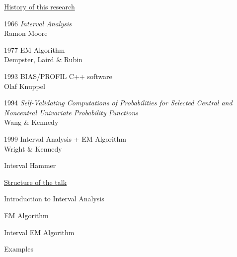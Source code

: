 \documentclass{slides}
\begin{document}
\begin{slide}
\begin{center}
\underline{History of this research}
\end{center}
1966 {\it Interval Analysis} \\
\hspace*{1in} Ramon Moore

1977 EM Algorithm \\
\hspace*{1in} Dempster, Laird \& Rubin

1993 BIAS/PROFIL C++ software \\
\hspace*{1in} Olaf Knuppel

1994 {\it Self-Validating Computations of Probabilities for Selected
        Central and Noncentral Univariate Probability Functions}\\
\hspace*{1in} Wang \& Kennedy

1999 Interval Analysis + EM Algorithm \\
\hspace*{1in} Wright \& Kennedy

\end{slide}
\begin{note}
Interval Hammer
\end{note}
\begin{slide}
\begin{center}
\underline{Structure of the talk}
\end{center}

Introduction to Interval Analysis

EM Algorithm

Interval EM Algorithm

Examples
\end{slide}
\end{document}
